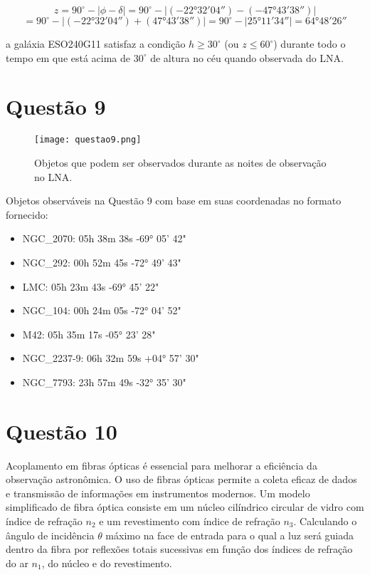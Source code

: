 \documentclass[a4paper, 12pt]{article}
\begin{document}
\[
z = 90^\circ - \left| \phi - \delta \right| 
= 90^\circ - \left| (-22°32'04'') - (-47°43'38'') \right| 
\]
\[
= 90^\circ - \left| (-22°32'04'') + (47°43'38'') \right| 
= 90^\circ - \left| 25°11'34'' \right| 
= 64°48'26''
\]

a galáxia ESO240G11 satisfaz a condição \(h \geq 30^\circ\) (ou \(z \leq 60^\circ\)) durante todo o tempo em que está acima de \(30^\circ\) de altura no céu quando observada do LNA.


\section*{Questão 9}

\begin{figure}[h]
    \centering
    \texttt{[image: questao9.png]}
    \caption{Objetos que podem ser observados durante as noites de observação no LNA.} %
    \label{fig:questao9}
\end{figure}

Objetos observáveis na Questão 9 com base em suas coordenadas no formato fornecido:

\begin{itemize}
    \item NGC\_2070: 05h 38m 38s -69° 05' 42"
    \item NGC\_292: 00h 52m 45s -72° 49' 43"
    \item LMC: 05h 23m 43s -69° 45' 22"
    \item NGC\_104: 00h 24m 05s -72° 04' 52"
    \item M42: 05h 35m 17s -05° 23' 28"
    \item NGC\_2237-9: 06h 32m 59s +04° 57' 30"
    \item NGC\_7793: 23h 57m 49s -32° 35' 30"
\end{itemize}


\section*{Questão 10}
Acoplamento em fibras ópticas é essencial para melhorar a eficiência da observação astronômica. O uso de fibras ópticas permite a coleta eficaz de dados e transmissão de informações em instrumentos modernos. Um modelo simplificado de fibra óptica consiste em um núcleo cilíndrico circular de vidro com índice de refração \(n_2\) e um revestimento com índice de refração \(n_3\). Calculando o ângulo de incidência \(\theta\) máximo na face de entrada para o qual a luz será guiada dentro da fibra por reflexões totais sucessivas em função dos índices de refração do ar \(n_1\), do núcleo e do revestimento.
\end{document}
